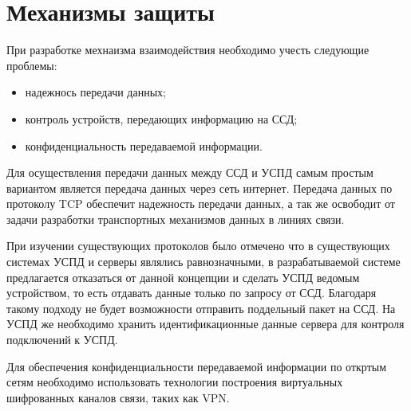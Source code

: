 \newpage
\section{Механизмы защиты}
\setcounter{figure}{0}

При разработке мехнаизма взаимодействия необходимо учесть следующие проблемы:
\begin{itemize}
 \item надежнось передачи данных;
 \item контроль устройств, передающих информацию на ССД;
 \item конфиденциальность передаваемой информации.
\end{itemize}

Для осуществления передачи данных между ССД и УСПД самым простым вариантом является передача данных через сеть интернет. Передача данных по протоколу TCP обеспечит надежность передачи данных, а так же освободит от задачи разработки транспортных механизмов данных в линиях связи.

При изучении существующих протоколов было отмечено что в существующих системах УСПД и серверы являлись равнозначными, в разрабатываемой системе предлагается отказаться от данной концепции и сделать УСПД ведомым устройством, то есть отдавать данные только по запросу от ССД. Благодаря такому подходу не будет возможности отправить поддельный пакет на ССД. На УСПД же необходимо хранить идентификационные данные сервера для контроля подключений к УСПД. 

Для обеспечения конфиденциальности передаваемой информации по откртым сетям необходимо использовать технологии построения виртуальных шифрованных каналов связи, таких как VPN.

